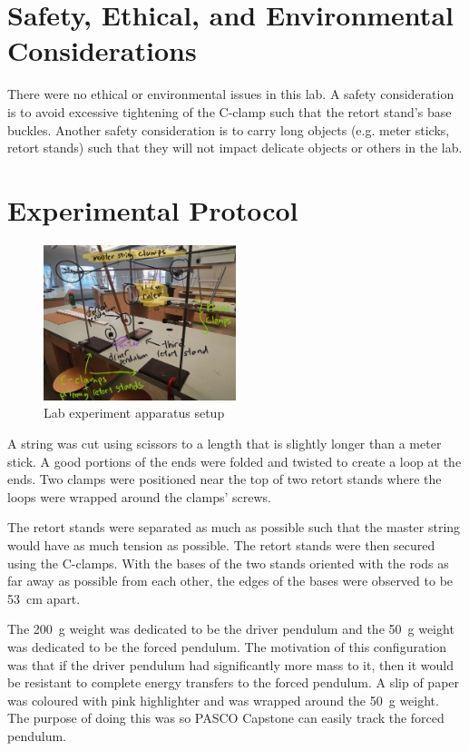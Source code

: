 \documentclass[letterpaper, 12pt]{article}
\begin{document}
\section{Safety, Ethical, and Environmental Considerations}

There were no ethical or environmental issues in
this lab. A safety consideration is to avoid
excessive tightening of the C-clamp such that
the retort stand's base buckles. Another
safety consideration is to carry long objects
(e.g. meter sticks, retort stands) such that
they will not impact delicate objects
or others in the lab.

\section{Experimental Protocol}

\begin{figure}
    \centering
    \includegraphics[width=0.5\textwidth]{entireSetup.jpg}
    \caption{Lab experiment apparatus setup}
    \label{fig:entireSetup}
\end{figure}

A string was cut using scissors to a length
that is slightly longer than a meter stick.
A good portions of the ends were folded and twisted
to create a loop at the ends. Two clamps were positioned
near the top of two retort stands where the loops were
wrapped around the clamps' screws.


The retort stands were separated
as much as possible such that the
master string would have as much
tension as possible. The retort stands
were then secured using the C-clamps.
With
the bases of the two stands oriented with
the rods as far away as possible from each other,
the edges of the bases were observed to be \SI{53}{cm}
apart.

The \SI{200}{g} weight was dedicated to be the
driver pendulum and the \SI{50}{g} weight was dedicated
to be the forced pendulum. The motivation of this configuration
was that if the driver pendulum had significantly more
mass to it, then it would be resistant to complete
energy transfers to the forced pendulum.
A slip of paper was coloured with pink highlighter
and was wrapped around the \SI{50}{g} weight. The
purpose of doing this was so PASCO Capstone can
easily track the forced pendulum.
\end{document}
